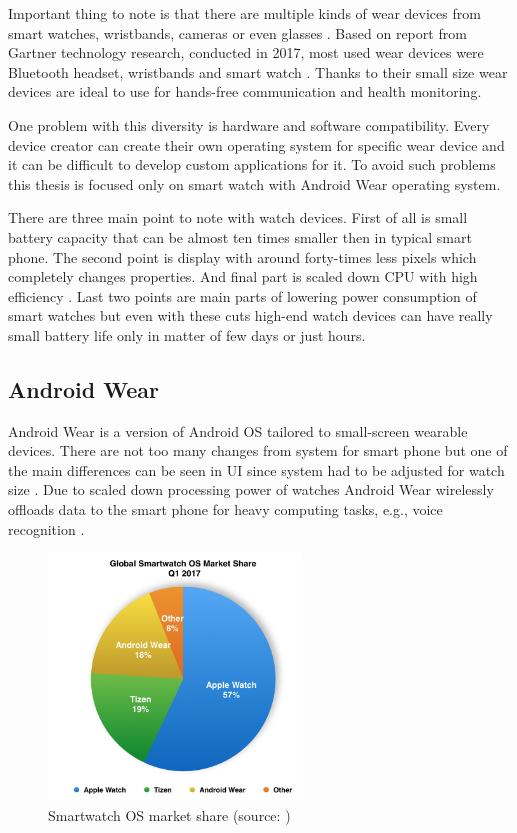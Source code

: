 Important thing to note is that there are multiple kinds of wear devices from smart watches, wristbands, cameras or even glasses \cite{MIWD}. Based on report from Gartner technology research, conducted in 2017, most used wear devices were Bluetooth headset, wristbands and smart watch \cite{GSWWDS}. Thanks to their small size wear devices are ideal to use for hands-free communication and health monitoring.

One problem with this diversity is hardware and software compatibility. Every device creator can create their own operating system for specific wear device and it can be difficult to develop custom applications for it. To avoid such problems this thesis is focused only on smart watch with Android Wear operating system. 

There are three main point to note with watch devices. First of all is small battery capacity that can be almost ten times smaller then in typical smart phone. The second point is display with around forty-times less pixels which completely changes properties. And final part is scaled down CPU with high efficiency \cite{UtCoAWO}. Last two points are main parts of lowering power consumption of smart watches but even with these cuts high-end watch devices can have really small battery life only in matter of few days or just hours.

\subsection{Android Wear}\label{sec:AndroidWear}
Android Wear is a version of Android OS tailored to small-screen wearable devices. There are not too many changes from system for smart phone but one of the main differences can be seen in UI since system had to be adjusted for watch size \cite{CSUITW}. Due to scaled down processing power of watches Android Wear wirelessly offloads data to the smart phone for heavy computing tasks, e.g., voice recognition \cite{UCAW}.

\begin{figure}[H]
	\begin{centering}
		\includegraphics[width=0.6\textwidth]{img/wear_market_share}
		\par\end{centering}
	\caption{Smartwatch OS market share (source: \cite{TOAW})\label{fig:SmartwatchOSMarketShare}}
	\label{fig7}
\end{figure}

